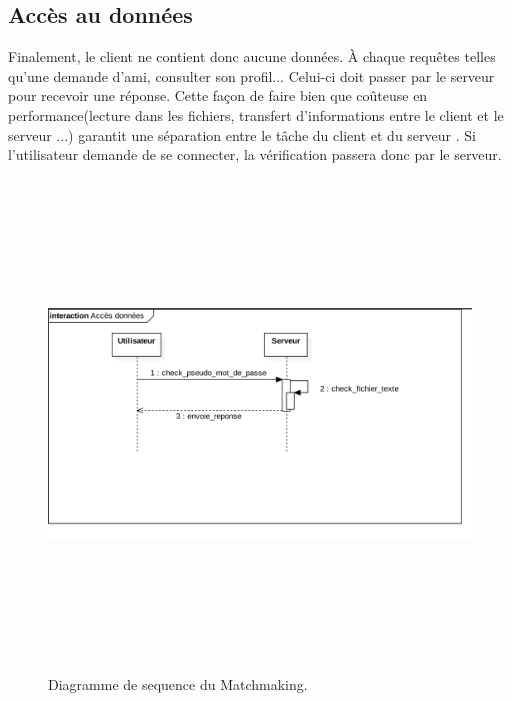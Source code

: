 \documentclass[12pt,a4paper]{article}
\begin{document}
\subsection{Accès au données}
Finalement, le client ne contient donc aucune données. À chaque requêtes telles qu'une demande d'ami, consulter son profil... Celui-ci doit passer par le serveur pour recevoir une réponse. Cette façon de faire bien que coûteuse en performance(lecture dans les fichiers, transfert d'informations entre le client et le serveur ...) garantit une séparation entre le tâche du  client et du serveur . Si l'utilisateur demande de se connecter, la vérification passera donc par le serveur.
\begin{figure}[H]
  \includegraphics[height=13cm,width=19cm]{RequestSequence.png} 
    \caption{Diagramme de sequence du Matchmaking.}
   \label{fig:picture}
 \end{figure}
\newpage 
\end{document}
